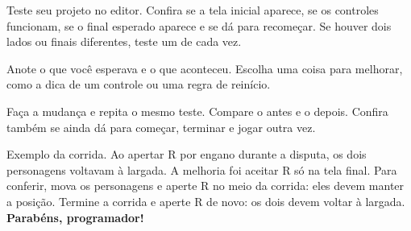\begin{desafio}
\begin{passos}
\item Teste seu projeto no editor. Confira se a tela inicial aparece, se os controles funcionam, se o final esperado aparece e se dá para recomeçar. Se houver dois lados ou finais diferentes, teste um de cada vez.
\item Anote o que você esperava e o que aconteceu. Escolha uma coisa para melhorar, como a dica de um controle ou uma regra de reinício.
\item Faça a mudança e repita o mesmo teste. Compare o antes e o depois. Confira também se ainda dá para começar, terminar e jogar outra vez.
\end{passos}
\end{desafio}

\begin{solucao}
Exemplo da corrida. Ao apertar R por engano durante a disputa, os dois personagens voltavam à largada. A melhoria foi aceitar R só na tela final. Para conferir, mova os personagens e aperte R no meio da corrida: eles devem manter a posição. Termine a corrida e aperte R de novo: os dois devem voltar à largada. \textbf{Parabéns, programador!}
\end{solucao}
